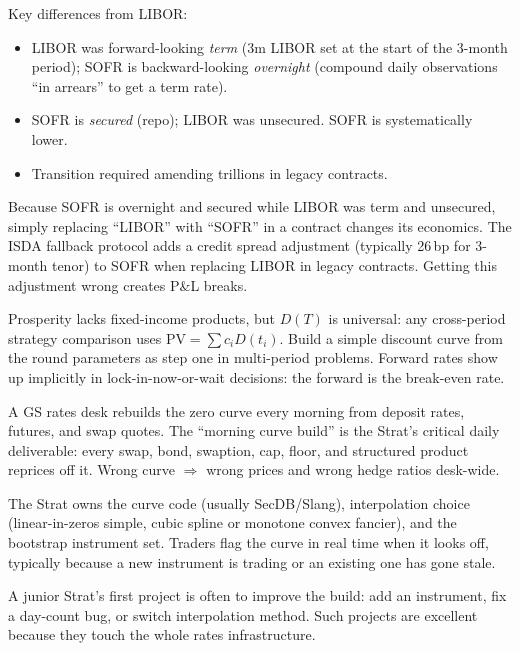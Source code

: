 Key differences from LIBOR:
\begin{itemize}
  \item LIBOR was forward-looking \emph{term} (3m LIBOR set at the
    start of the 3-month period); SOFR is backward-looking
    \emph{overnight} (compound daily observations ``in arrears'' to
    get a term rate).
  \item SOFR is \emph{secured} (repo); LIBOR was unsecured.  SOFR is
    systematically lower.
  \item Transition required amending trillions in legacy contracts.
\end{itemize}

\begin{pitfallbox}
Because SOFR is overnight and secured while LIBOR was term and
unsecured, simply replacing ``LIBOR'' with ``SOFR'' in a contract
changes its economics.  The ISDA fallback protocol adds a credit
spread adjustment (typically 26\,bp for 3-month tenor) to SOFR when
replacing LIBOR in legacy contracts.  Getting this adjustment wrong
creates P\&L breaks.
\end{pitfallbox}



\begin{prosperitybox}
Prosperity lacks fixed-income products, but $D(T)$ is universal: any
cross-period strategy comparison uses $\text{PV} = \sum c_i D(t_i)$.
Build a simple discount curve from the round parameters as step one
in multi-period problems.  Forward rates show up implicitly in
lock-in-now-or-wait decisions: the forward is the break-even rate.
\end{prosperitybox}

\begin{gsbox}
A GS rates desk rebuilds the zero curve every morning from deposit
rates, futures, and swap quotes.  The ``morning curve build'' is the
Strat's critical daily deliverable: every swap, bond, swaption,
cap, floor, and structured product reprices off it.  Wrong curve
$\Rightarrow$ wrong prices and wrong hedge ratios desk-wide.

The Strat owns the curve code (usually SecDB/Slang), interpolation
choice (linear-in-zeros simple, cubic spline or monotone convex
fancier), and the bootstrap instrument set.  Traders flag the curve
in real time when it looks off, typically because a new instrument
is trading or an existing one has gone stale.

A junior Strat's first project is often to improve the build: add an
instrument, fix a day-count bug, or switch interpolation method.
Such projects are excellent because they touch the whole rates
infrastructure.
\end{gsbox}

